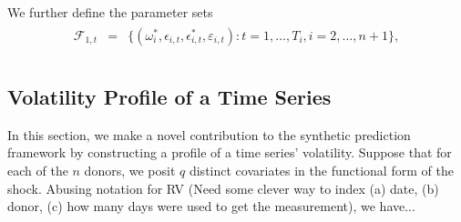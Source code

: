 \documentclass[11pt]{article}
\theoremstyle{definition}
\begin{document}
    We further define the parameter sets
    \begin{align}
      \begin{array}{lll}
         \mathcal{F}_{1,t} &= &\{(\omega^{*}_i, \epsilon_{i,t}, \epsilon^{*}_{i,t}, \varepsilon_{i,t})\colon t= 1, \ldots, T_i, i = 2, \ldots, n +1\},\\
      \end{array}
    \end{align}\label{parameter}

    \subsection{Volatility Profile of a Time Series}
    \label{Volatility Profile of a Time Series}
    
    In this section, we make a novel contribution to the synthetic prediction framework by constructing a profile of a time series' volatility.  Suppose that for each of the $n$ donors, we posit $q$ distinct covariates in the functional form of the shock.  Abusing notation for RV (Need some clever way to index (a) date, (b) donor, (c) how many days were used to get the measurement), we have...
\end{document}
